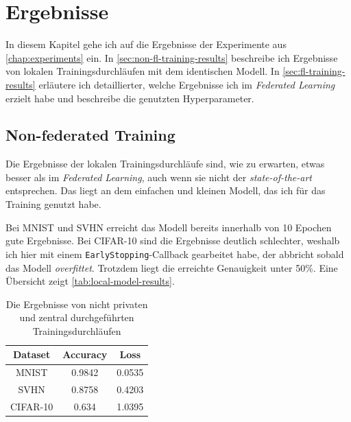 \chapter{Ergebnisse}\label{chap:results}

In diesem Kapitel gehe ich auf die Ergebnisse der Experimente aus \autoref{chap:experiments} ein. In \autoref{sec:non-fl-training-results} beschreibe ich Ergebnisse von lokalen Trainingsdurchläufen mit dem identischen Modell. In \autoref{sec:fl-training-results} erläutere ich detaillierter, welche Ergebnisse ich im \textit{Federated Learning} erzielt habe und beschreibe die genutzten Hyperparameter.

\section{Non-federated Training} \label{sec:non-fl-training-results}
Die Ergebnisse der lokalen Trainingsdurchläufe sind, wie zu erwarten, etwas besser als im \textit{Federated Learning}, auch wenn sie nicht der \textit{state-of-the-art} entsprechen. Das liegt an dem einfachen und kleinen Modell, das ich für das Training genutzt habe.

Bei MNIST und SVHN erreicht das Modell bereits innerhalb von 10 Epochen gute Ergebnisse. Bei CIFAR-10 sind die Ergebnisse deutlich schlechter, weshalb ich hier mit einem \texttt{EarlyStopping}-Callback gearbeitet habe, der abbricht sobald das Modell \textit{overfittet}. Trotzdem liegt die erreichte Genauigkeit unter 50\%. Eine Übersicht zeigt \autoref{tab:local-model-results}.

\begin{table}
	\centering
	\begin{tabular}{ccc}
		\toprule
		Dataset & Accuracy & Loss \\
		\midrule
		MNIST & 0.9842 & 0.0535 \\
		SVHN & 0.8758 & 0.4203 \\
		CIFAR-10 & 0.634 & 1.0395 \\
		\bottomrule
	\end{tabular}
	\caption{Die Ergebnisse von nicht privaten und zentral durchgeführten Trainingsdurchläufen}
	\label{tab:local-model-results}
\end{table}

